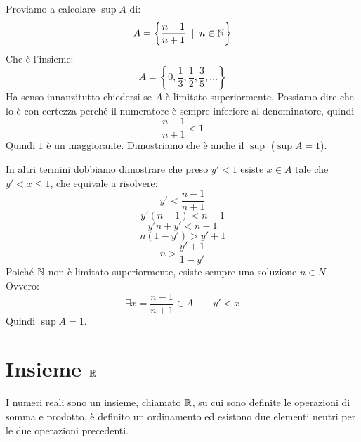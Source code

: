 \begin{example}
Proviamo a calcolare $\sup A$ di:
\begin{equation}
A = \left\{\frac{n-1}{n+1} \; \mid \; n \in \mathbb N \right\}
\end{equation}
Che è l'insieme:
\begin{equation}
A = \left\{0, \frac{1}{3}, \frac{1}{2}, \frac{3}{5}, \ldots \right\}
\end{equation}
Ha senso innanzitutto chiedersi se $A$ è limitato superiormente. Possiamo dire che lo è con certezza perché il numeratore è sempre inferiore al denominatore, quindi
\begin{equation}
\frac{n-1}{n+1} < 1
\end{equation}
Quindi $1$ è un maggiorante. Dimostriamo che è anche il $\sup$ ($\sup A = 1$).

In altri termini dobbiamo dimostrare che preso $y' < 1$ esiste $x \in A$ tale che $y' < x \le 1$, che equivale a risolvere:
\begin{equation}
y' < \frac{n-1}{n+1}
\end{equation}
\begin{equation}
y' (n+1) < n-1
\end{equation}
\begin{equation}
y'n + y' < n -1
\end{equation}
\begin{equation}
n(1-y')>y'+1
\end{equation}
\begin{equation}
n > \frac{y'+1}{1-y'}
\end{equation}
Poiché $\mathbb N$ non è limitato superiormente, esiste sempre una soluzione $n \in N$. Ovvero:
\begin{equation}
\exists x = \frac{n-1}{n+1} \in A \qquad y' < x
\end{equation}
Quindi $\sup A = 1$.
\end{example}

\section{Insieme $\mathbb R$}

I numeri reali sono un insieme, chiamato $\mathbb R$, su cui sono definite le operazioni di somma e prodotto, è definito un ordinamento ed esistono due elementi neutri per le due operazioni precedenti.

